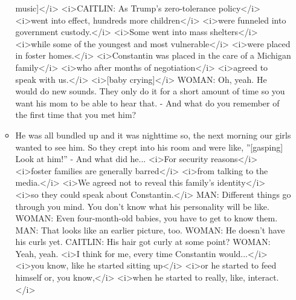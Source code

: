 \begin{itemize}
\begin{itemize}
    music{]}\textless{}/i\textgreater{}
    \textless{}i\textgreater{}CAITLIN: As Trump's zero-tolerance
    policy\textless{}/i\textgreater{} \textless{}i\textgreater{}went
    into effect, hundreds more children\textless{}/i\textgreater{}
    \textless{}i\textgreater{}were funneled into government
    custody.\textless{}/i\textgreater{} \textless{}i\textgreater{}Some
    went into mass shelters\textless{}/i\textgreater{}
    \textless{}i\textgreater{}while some of the youngest and most
    vulnerable\textless{}/i\textgreater{} \textless{}i\textgreater{}were
    placed in foster homes.\textless{}/i\textgreater{}
    \textless{}i\textgreater{}Constantin was placed in the care of a
    Michigan family\textless{}/i\textgreater{}
    \textless{}i\textgreater{}who after months of
    negotiation\textless{}/i\textgreater{}
    \textless{}i\textgreater{}agreed to speak with
    us.\textless{}/i\textgreater{} \textless{}i\textgreater{}{[}baby
    crying{]}\textless{}/i\textgreater{} WOMAN: Oh, yeah. He would do
    new sounds. They only do it for a short amount of time so you want
    his mom to be able to hear that. - And what do you remember of the
    first time that you met him?
  \item
    He was all bundled up and it was nighttime so, the next morning our
    girls wanted to see him. So they crept into his room and were like,
    ''{[}gasping{]} Look at him!'' - And what did he...
    \textless{}i\textgreater{}For security
    reasons\textless{}/i\textgreater{} \textless{}i\textgreater{}foster
    families are generally barred\textless{}/i\textgreater{}
    \textless{}i\textgreater{}from talking to the
    media.\textless{}/i\textgreater{} \textless{}i\textgreater{}We
    agreed not to reveal this family's
    identity\textless{}/i\textgreater{} \textless{}i\textgreater{}so
    they could speak about Constantin.\textless{}/i\textgreater{} MAN:
    Different things go through you mind. You don't know what his
    personality will be like. WOMAN: Even four-month-old babies, you
    have to get to know them. MAN: That looks like an earlier picture,
    too. WOMAN: He doesn't have his curls yet. CAITLIN: His hair got
    curly at some point? WOMAN: Yeah, yeah. \textless{}i\textgreater{}I
    think for me, every time Constantin
    would...\textless{}/i\textgreater{} \textless{}i\textgreater{}you
    know, like he started sitting up\textless{}/i\textgreater{}
    \textless{}i\textgreater{}or he started to feed himself or, you
    know,\textless{}/i\textgreater{} \textless{}i\textgreater{}when he
    started to really, like, interact.\textless{}/i\textgreater{}

\end{itemize}
\end{itemize}
